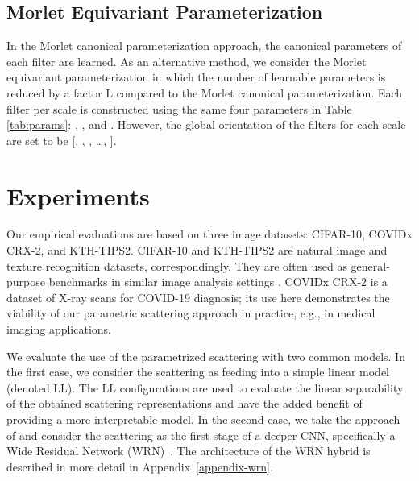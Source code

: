 \documentclass[10pt,twocolumn,letterpaper]{article}
\begin{document}
\subsection{Morlet Equivariant Parameterization }
\label{sec:eq}
In the Morlet canonical parameterization approach, the canonical parameters of each filter are learned. As an alternative method, we consider the Morlet equivariant parameterization in which the number of learnable parameters is reduced by a factor L compared to the Morlet canonical parameterization. Each filter per scale is constructed using the same four parameters in Table \ref{tab:params}: , ,  and . 
However, the global orientation of the  filters for each scale are set to be [, , , \ldots ,  ]. 







\section{Experiments}
\label{sec:exp-setup}
\label{sec:results}
Our empirical evaluations are based on three image datasets: CIFAR-10,  COVIDx CRX-2, and KTH-TIPS2. CIFAR-10 and KTH-TIPS2 are natural image and texture recognition datasets, correspondingly. They are often used as general-purpose benchmarks in similar image analysis settings \cite{glico,sifre2013rotation}. COVIDx CRX-2 is a dataset of X-ray scans for COVID-19 diagnosis; its use here demonstrates the viability of our parametric scattering approach in practice, e.g., in medical imaging applications.

We evaluate the use of the parametrized scattering with two common models. In the first case, we consider the scattering as feeding into a simple linear model (denoted LL). The LL configurations are used to evaluate the linear separability of the obtained scattering representations and have the added benefit of providing a more interpretable model. In the second case, we take the approach of \cite{oyallon2018replearning} and  consider the scattering as the first stage of a deeper CNN, specifically a Wide Residual Network (WRN)~\cite{wideresnet}. The architecture of the WRN hybrid is described in more detail in Appendix~\ref{appendix-wrn}.
\end{document}
